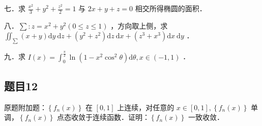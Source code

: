 \documentclass{article}
\begin{document}
七．求 \(\frac{x^{2}}{3}+y^{2}+\frac{z^{2}}{2}=1\) 与 \(2 x+y+z=0\) 相交所得椭圆的面积．

八．\(\sum: z=x^{2}+y^{2}(0 \leq z \leq 1)\) ，方向取上侧，求 \(\iint_{\sum}(x+y) \mathrm{d} y \mathrm{~d} z+\left(y^{2}+z^{2}\right) \mathrm{d} z \mathrm{~d} x+\left(z^{3}+x^{3}\right) \mathrm{d} x \mathrm{~d} y\) ．

九．求 \(I(x)=\int_{0}^{\frac{\pi}{2}} \ln \left(1-x^{2} \cos ^{2} \theta\right) \mathrm{d} \theta, x \in(-1,1)\) ．

\subsection{题目12}
原题附加题：\(\left\{f_{n}(x)\right\}\) 在 \([0,1]\) 上连续，对任意的 \(x \in[0,1],\left\{f_{n}(x)\right\}\) 单调，\(\left\{f_{n}(x)\right\}\) 点态收敛于连续函数．证明：\(\left\{f_{n}(x)\right\}\) 一致收敛．
\end{document}
